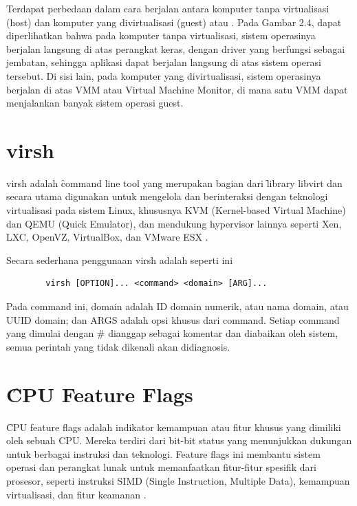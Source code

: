 Terdapat perbedaan dalam cara berjalan antara komputer tanpa virtualisasi (host) dan komputer yang divirtualisasi (guest) atau \vm. Pada Gambar 2.4, dapat diperlihatkan bahwa pada komputer tanpa virtualisasi, sistem operasinya berjalan langsung di atas perangkat keras, dengan driver yang berfungsi sebagai jembatan, sehingga aplikasi dapat berjalan langsung di atas sistem operasi tersebut. Di sisi lain, pada komputer yang divirtualisasi, sistem operasinya berjalan di atas VMM atau Virtual Machine Monitor, di mana satu VMM dapat menjalankan banyak sistem operasi guest.

\section{virsh}
virsh adalah \f{command line tool} yang merupakan bagian dari \f{library} libvirt dan secara utama digunakan untuk mengelola dan berinteraksi dengan teknologi virtualisasi pada sistem Linux, khususnya KVM (Kernel-based Virtual Machine) dan QEMU (Quick Emulator), dan mendukung hypervisor lainnya seperti Xen, LXC, OpenVZ, VirtualBox, dan VMware ESX \cite{libvirtLibvirtVirsh}.

Secara sederhana penggunaan virsh adalah seperti ini
\begin{center}
	\begin{verbatim}
		virsh [OPTION]... <command> <domain> [ARG]...
	\end{verbatim}
\end{center}

Pada command ini, domain adalah ID domain numerik, atau nama domain, atau UUID domain; dan ARGS adalah opsi khusus dari command. Setiap command yang dimulai dengan \# dianggap sebagai komentar dan diabaikan oleh sistem, semua perintah yang tidak dikenali akan didiagnosis.

\section{\f{CPU Feature Flags}}

\f{CPU feature flags} adalah indikator kemampuan atau fitur khusus yang dimiliki oleh sebuah CPU. Mereka terdiri dari bit-bit status yang menunjukkan dukungan untuk berbagai instruksi dan teknologi. Feature flags ini membantu sistem operasi dan perangkat lunak untuk memanfaatkan fitur-fitur spesifik dari prosesor, seperti instruksi SIMD (Single Instruction, Multiple Data), kemampuan virtualisasi, dan fitur keamanan \cite{torvaldsLinux}.

